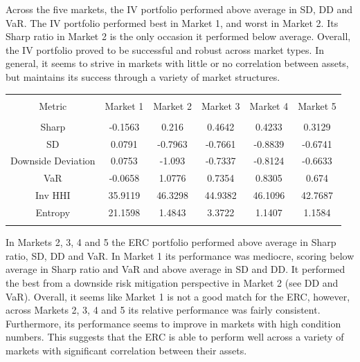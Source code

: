 \documentclass[11pt,preprint, authoryear]{elsarticle}
\let\origtable\table
\let\endorigtable\endtable
\renewenvironment{table}[1][2] {
    \expandafter\origtable\expandafter[H]
} {
    \endorigtable
}
\numberwithin{equation}{section}
\numberwithin{figure}{section}
\numberwithin{table}{section}
\begin{document}
Across the five markets, the IV portfolio performed above average in SD,
DD and VaR. The IV portfolio performed best in Market 1, and worst in
Market 2. Its Sharp ratio in Market 2 is the only occasion it performed
below average. Overall, the IV portfolio proved to be successful and
robust across market types. In general, it seems to strive in markets
with little or no correlation between assets, but maintains its success
through a variety of market structures.

\begin{table}[!htbp] \centering 
  \caption{Equal Risk Contribution} 
  \label{erc} 
\begin{tabular}{@{\extracolsep{5pt}} cccccc} 
\\[-1.8ex]\hline 
\hline \\[-1.8ex] 
Metric & Market 1 & Market 2 & Market 3 & Market 4 & Market 5 \\ 
\hline \\[-1.8ex] 
Sharp & -0.1563 & 0.216 & 0.4642 & 0.4233 & 0.3129 \\ 
SD & 0.0791 & -0.7963 & -0.7661 & -0.8839 & -0.6741 \\ 
Downside Deviation & 0.0753 & -1.093 & -0.7337 & -0.8124 & -0.6633 \\ 
VaR & -0.0658 & 1.0776 & 0.7354 & 0.8305 & 0.674 \\ 
Inv HHI & 35.9119 & 46.3298 & 44.9382 & 46.1096 & 42.7687 \\ 
Entropy & 21.1598 & 1.4843 & 3.3722 & 1.1407 & 1.1584 \\ 
\hline \\[-1.8ex] 
\end{tabular} 
\end{table}

In Markets 2, 3, 4 and 5 the ERC portfolio performed above average in
Sharp ratio, SD, DD and VaR. In Market 1 its performance was mediocre,
scoring below average in Sharp ratio and VaR and above average in SD and
DD. It performed the best from a downside risk mitigation perspective in
Market 2 (see DD and VaR). Overall, it seems like Market 1 is not a good
match for the ERC, however, across Markets 2, 3, 4 and 5 its relative
performance was fairly consistent. Furthermore, its performance seems to
improve in markets with high condition numbers. This suggests that the
ERC is able to perform well across a variety of markets with significant
correlation between their assets.
\end{document}
